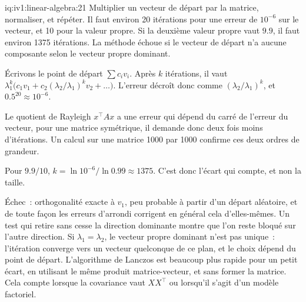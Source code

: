 \begin{solution}{iq:iv1:linear-algebra:21}
Multiplier un vecteur de départ par la matrice, normaliser, et répéter. Il faut environ 20 itérations pour une erreur de $10^{-6}$ sur le vecteur, et 10 pour la valeur propre. Si la deuxième valeur propre vaut $9.9$, il faut environ 1375 itérations. La méthode échoue si le vecteur de départ n'a aucune composante selon le vecteur propre dominant.

Écrivons le point de départ $\sum c_iv_i$. Après $k$ itérations, il vaut $\lambda_1^k\bigl(c_1v_1 + c_2(\lambda_2/\lambda_1)^kv_2 + \dots\bigr)$. L'erreur décroît donc comme $(\lambda_2/\lambda_1)^k$, et $0.5^{20} \approx 10^{-6}$.

Le quotient de Rayleigh $x^\top Ax$ a une erreur qui dépend du carré de l'erreur du vecteur, pour une matrice symétrique, il demande donc deux fois moins d'itérations. Un calcul sur une matrice 1000 par 1000 confirme ces deux ordres de grandeur.

Pour $9.9/10$, $k = \ln 10^{-6}/\ln 0.99 \approx 1375$. C'est donc l'écart qui compte, et non la taille.

Échec~: orthogonalité exacte à $v_1$, peu probable à partir d'un départ aléatoire, et de toute façon les erreurs d'arrondi corrigent en général cela d'elles-mêmes. Un test qui retire sans cesse la direction dominante montre que l'on reste bloqué sur l'autre direction. Si $\lambda_1 = \lambda_2$, le vecteur propre dominant n'est pas unique~: l'itération converge vers un vecteur quelconque de ce plan, et le choix dépend du point de départ. L'algorithme de Lanczos est beaucoup plus rapide pour un petit écart, en utilisant le même produit matrice-vecteur, et sans former la matrice. Cela compte lorsque la covariance vaut $XX^\top$ ou lorsqu'il s'agit d'un modèle factoriel.

\end{solution}

